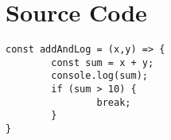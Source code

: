 \chapter{Source Code}

\begin{lstlisting}[style=ES6, caption=Beispiel Caption, label=Beispiel Label]
const addAndLog = (x,y) => {
		const sum = x + y;
		console.log(sum);
		if (sum > 10) {
				break;
		}
}
\end{lstlisting}


